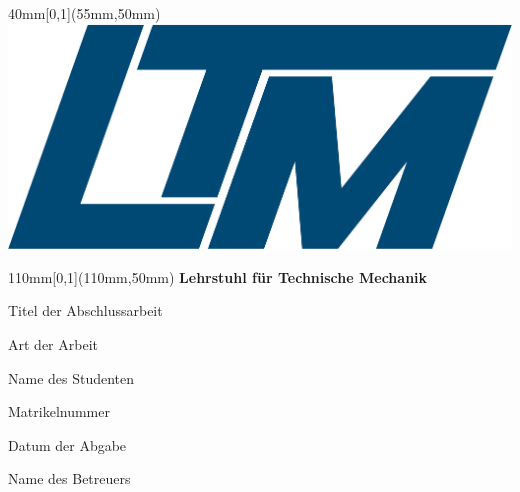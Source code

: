 \documentclass[12pt,a4paper]{article}
\newcommand{\Titel}{Titel der Abschlussarbeit}
\newcommand{\Name}{Name des Studenten}
\newcommand{\Typ}{Art der Arbeit}
\newcommand{\Mat}{Matrikelnummer}
\newcommand{\Datum}{Datum der Abgabe}
\newcommand{\Betreuer}{Name des Betreuers}
\begin{document}
  \begin{titlepage}
    
    \begin{textblock*}{40mm}[0,1](55mm,50mm)
      \includegraphics[scale=0.15]{LTM_Logo.png}
    \end{textblock*}
   
    
    \begin{textblock*}{110mm}[0,1](110mm,50mm)
      \color{FAU_Blue}\bf\Large
      Lehrstuhl für Technische Mechanik
    \end{textblock*}

     

    	\begin{center}
    		\color{black}
    		\vspace*{40mm}
    		
    		\parbox{0.5\textwidth}{\LARGE \centering \Titel}
    		
    		\vspace*{12mm}
    		
			\parbox{0.5\textwidth}{\large \centering \Typ}
			
			\vspace*{23mm}
			
			\parbox{0.5\textwidth}{\large \centering \Name}
			
			\vspace*{2mm}
			
			\parbox{0.5\textwidth}{\large \centering \Mat}
			
			\vspace*{90mm}
			
			\parbox{0.5\textwidth}{\large \centering \Datum}
			
			\vspace*{2mm}
			
			\parbox{0.8\textwidth}{\large \centering \Betreuer}
    	\end{center}



\end{titlepage}
\end{document}
